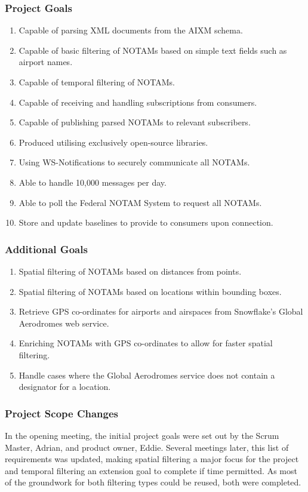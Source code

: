 \documentclass[a4paper, 12pt, twoside]{article}
\begin{document}
\subsubsection{Project Goals}
\begin{enumerate}
\item Capable of parsing XML documents from the AIXM schema.
\item Capable of basic filtering of NOTAMs based on simple text fields such as airport names.
\item Capable of temporal filtering of NOTAMs.
\item Capable of receiving and handling subscriptions from consumers.
\item Capable of publishing parsed NOTAMs to relevant subscribers.
\item Produced utilising exclusively open-source libraries.
\item Using WS-Notifications to securely communicate all NOTAMs.
\item Able to handle 10,000 messages per day.
\item Able to poll the Federal NOTAM System to request all NOTAMs.
\item Store and update baselines to provide to consumers upon connection.
\end{enumerate}

\subsubsection{Additional Goals}
\begin{enumerate}
\item Spatial filtering of NOTAMs based on distances from points.
\item Spatial filtering of NOTAMs based on locations within bounding boxes.
\item Retrieve GPS co-ordinates for airports and airspaces from Snowflake's Global Aerodromes web service.
\item Enriching NOTAMs with GPS co-ordinates to allow for faster spatial filtering.
\item Handle cases where the Global Aerodromes service does not contain a designator for a location.
\end{enumerate}

\subsubsection{Project Scope Changes}
In the opening meeting, the initial project goals were set out by the Scrum Master, Adrian, and product owner, Eddie. Several meetings later, this list of requirements was updated, making spatial filtering a major focus for the project and temporal filtering an extension goal to complete if time permitted. As most of the groundwork for both filtering types could be reused, both were completed.
\end{document}
